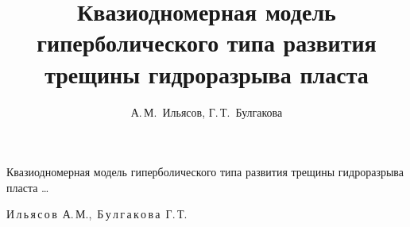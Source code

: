 


 

%

 

 \tableofcontents

 \newpage



\renewcommand{\firstpage}{0}

\renewcommand{\lastpage}{0}

 \newcommand{\bigcom}{\text{\usefont{T2A}{cmfib}{m}{n}\large{\raisebox{1pt}{,}}}} %
















\title{Квазиодномерная модель гиперболического типа развития трещины гидроразрыва пласта}%

{Квазиодномерная модель гиперболического типа развития трещины гидроразрыва пласта \dots}%



\author{А.\,М.~Ильясов, Г.\,Т.~Булгакова}%

{И\,л\,ь\,я\,с\,о\,в~А.\,М.,\ Б\,у\,л\,г\,а\,к\,о\,в\,а~Г.\,Т.}%







